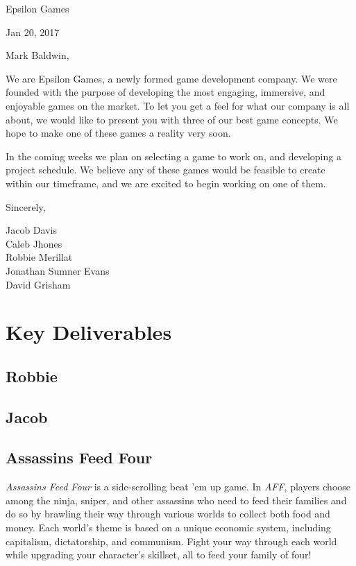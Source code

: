 \documentclass[12pt]{article}
\newcommand\tab[1][.5in]{\hspace*{#1}}
\begin{document}

\hfill Epsilon Games

\hfill Jan 20, 2017

Mark Baldwin,

We are Epsilon Games, a newly formed game development company. We were founded with the purpose of
developing the most engaging, immersive, and enjoyable games on the market. To let you get a feel
for what our company is all about, we would like to present you with three of our best game
concepts. We hope to make one of these games a reality very soon.

In the coming weeks we plan on selecting a game to work on, and developing a project schedule. We
believe any of these games would be feasible to create within our timeframe, and we are excited to
begin working on one of them.

Sincerely,

\tab Jacob Davis \\
\tab Caleb Jhones \\
\tab Robbie Merillat \\
\tab Jonathan Sumner Evans \\
\tab David Grisham \\

\newpage
\section*{Key Deliverables}

\subsection*{Robbie}


\subsection*{Jacob}


\subsection*{Assassins Feed Four}

{\it Assassins Feed Four} is a side-scrolling beat 'em up game. In {\it AFF},
players choose among the ninja, sniper, and other assassins who need to feed
their families and do so by brawling their way through various worlds to collect
both food and money. Each world's theme is based on a unique economic system,
including capitalism, dictatorship, and communism. Fight your way through each
world while upgrading your character's skillset, all to feed your family of
four!
\end{document}
